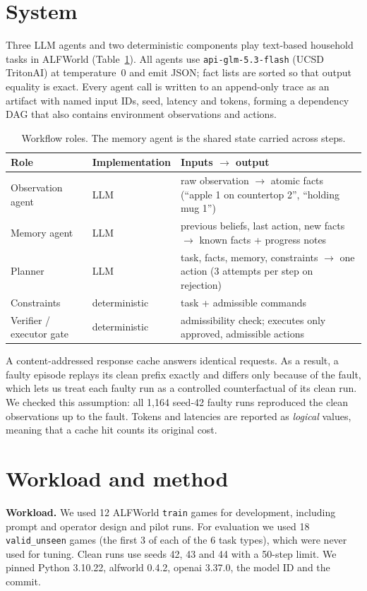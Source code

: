 \documentclass[10pt]{article}
\newcommand{\code}[1]{\texttt{\small #1}}
\begin{document}
\section{System}
Three LLM agents and two deterministic components play text-based household tasks in
ALFWorld (Table~\ref{tab:roles}). All agents use \code{api-glm-5.3-flash} (UCSD TritonAI)
at temperature~0 and emit JSON; fact lists are sorted so that output equality is exact.
Every agent call is written to an append-only trace as an artifact with named input IDs,
seed, latency and tokens, forming a dependency DAG that also contains environment
observations and actions.

\begin{table}[h]
\centering\small
\caption{Workflow roles. The memory agent is the shared state carried across steps.}
\label{tab:roles}
\begin{tabularx}{\linewidth}{@{}l l X@{}}
\toprule
Role & Implementation & Inputs $\rightarrow$ output \\
\midrule
Observation agent & LLM & raw observation $\rightarrow$ atomic facts (``apple 1 on countertop 2'', ``holding mug 1'') \\
Memory agent & LLM & previous beliefs, last action, new facts $\rightarrow$ known facts + progress notes \\
Planner & LLM & task, facts, memory, constraints $\rightarrow$ one action (3 attempts per step on rejection) \\
Constraints & deterministic & task + admissible commands \\
Verifier / executor gate & deterministic & admissibility check; executes only approved, admissible actions \\
\bottomrule
\end{tabularx}
\end{table}

A content-addressed response cache answers identical requests. As a result, a faulty episode
replays its clean prefix exactly and differs only because of the fault, which lets us treat
each faulty run as a controlled counterfactual of its clean run. We checked this assumption:
all 1,164 seed-42 faulty runs reproduced the clean observations up to the fault. Tokens and
latencies are reported as \emph{logical} values, meaning that a cache hit counts its original
cost.

\section{Workload and method}
\textbf{Workload.} We used 12 ALFWorld \code{train} games for development, including prompt
and operator design and pilot runs. For evaluation we used 18 \code{valid\_unseen} games (the
first 3 of each of the 6 task types), which were never used for tuning. Clean runs use seeds
42, 43 and 44 with a 50-step limit. We pinned Python 3.10.22, alfworld 0.4.2, openai 3.37.0,
the model ID and the commit.
\end{document}
